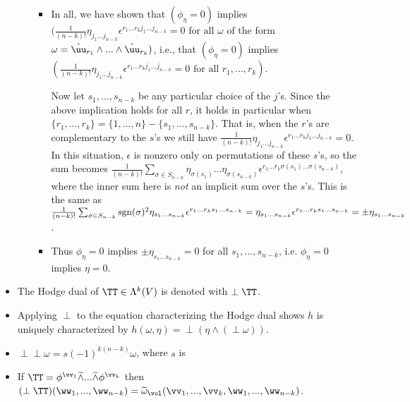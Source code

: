 \documentclass{article}
\begin{document}
\begin{itemize}
\begin{itemize}
\begin{itemize}
            \item In all, we have shown that $(\phi_\eta = 0)$ implies $(\frac{1}{(n - k)!} \eta_{j_1 ... j_{n - k}} \epsilon^{r_1 ... r_k j_1 ... j_{n - k}} = 0 \text{ for all $\omega$ of the form}$ \\ $\omega = \huu_{r_1} \wedge ... \wedge \huu_{r_k})$, i.e., that $(\phi_\eta = 0)$ implies $(\frac{1}{(n - k)!} \eta_{j_1 ... j_{n - k}} \epsilon^{r_1 ... r_k j_1 ... j_{n - k}} = 0 \text{ for all $r_1, ..., r_k$})$.
            
            Now let $s_1, ..., s_{n - k}$ be any particular choice of the $j$'s. Since the above implication holds for all $r$, it holds in particular when $\{r_1, ..., r_k\} = \{1, ..., n\} - \{s_1, ..., s_{n - k}\}$. That is, when the $r$'s are complementary to the $s$'s we still have $\frac{1}{(n - k)!} \eta_{j_1 ... j_{n - k}} \epsilon^{r_1 ... r_k j_1 ... j_{n - k}} = 0$. In this situation, $\epsilon$ is nonzero only on permutations of these $s$'s, so the sum becomes $\frac{1}{(n - k)!} \sum_{\sigma \in S_{n - k}} \eta_{\sigma(s_1)} ... \eta_{\sigma(s_{n - k})} \epsilon^{r_1 ... r_k \sigma(s_1) ... \sigma(s_{n - k})}$, where the inner sum here is \textit{not} an implicit sum over the $s$'s. This is the same as \\ $\frac{1}{(n - k)!} \sum_{\sigma \in S_{n - k}} \text{sgn}(\sigma)^2 \eta_{s_1 ... s_{n - k}} \epsilon^{r_1 ... r_k s_1 ... s_{n - k}} = \eta_{s_1 ... s_{n - k}} \epsilon^{r_1 ... r_k s_1 ... s_{n - k}} = \pm \eta_{s_1 ... s_{n - k}}$. 
            
            \item Thus $\phi_\eta = 0$ implies $\pm \eta_{s_1 ... s_{n - k}} = 0$ for all $s_1, ..., s_{n - k}$, i.e. $\phi_\eta = 0$ implies $\eta = 0$.
        \end{itemize}
    \end{itemize}
    \item The Hodge dual of $\TT \in \Lambda^k(V)$ is denoted with $\perp \TT$.
    \item Applying $\perp$ to the equation characterizing the Hodge dual shows $h$ is uniquely characterized by $h(\omega, \eta) = \perp(\eta \wedge (\perp \omega))$.
    \item $\perp \perp 
    \omega = s (-1)^{k(n - k)} \omega$, where $s$ is
    \item If $\TT = \phi^{\vv_1} \twedge ... \twedge \phi^{\vv_k}$ then $(\perp \TT)(\ww_1, ..., \ww_{n - k}) = \widetilde{\omega}_\vol(\vv_1, ..., \vv_k, \ww_1, ..., \ww_{n - k})$.
\end{itemize}
\end{document}
